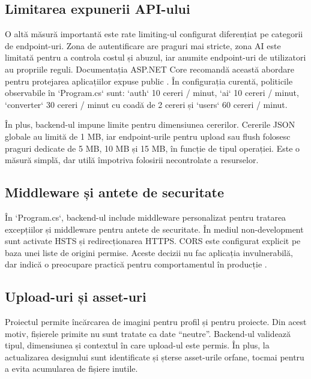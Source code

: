 \subsection{Limitarea expunerii API-ului}

O altă măsură importantă este rate limiting-ul configurat diferențiat pe categorii de endpoint-uri. Zona de autentificare are praguri mai stricte, zona AI este limitată pentru a controla costul și abuzul, iar anumite endpoint-uri de utilizatori au propriile reguli. Documentația ASP.NET Core recomandă această abordare pentru protejarea aplicațiilor expuse public \cite{aspnetRateLimiting2025}. În configurația curentă, politicile observabile în `Program.cs` sunt: `auth` 10 cereri / minut, `ai` 10 cereri / minut, `converter` 30 cereri / minut cu coadă de 2 cereri și `users` 60 cereri / minut.

În plus, backend-ul impune limite pentru dimensiunea cererilor. Cererile JSON globale au limită de 1 MB, iar endpoint-urile pentru upload sau flush folosesc praguri dedicate de 5 MB, 10 MB și 15 MB, în funcție de tipul operației. Este o măsură simplă, dar utilă împotriva folosirii necontrolate a resurselor.

\subsection{Middleware și antete de securitate}

În `Program.cs`, backend-ul include middleware personalizat pentru tratarea excepțiilor și middleware pentru antete de securitate. În mediul non-development sunt activate HSTS și redirecționarea HTTPS. CORS este configurat explicit pe baza unei liste de origini permise. Aceste decizii nu fac aplicația invulnerabilă, dar indică o preocupare practică pentru comportamentul în producție \cite{aspnetCors2024,aspnetErrorHandling2025}.

\subsection{Upload-uri și asset-uri}

Proiectul permite încărcarea de imagini pentru profil și pentru proiecte. Din acest motiv, fișierele primite nu sunt tratate ca date ``neutre''. Backend-ul validează tipul, dimensiunea și contextul în care upload-ul este permis. În plus, la actualizarea designului sunt identificate și șterse asset-urile orfane, tocmai pentru a evita acumularea de fișiere inutile.

